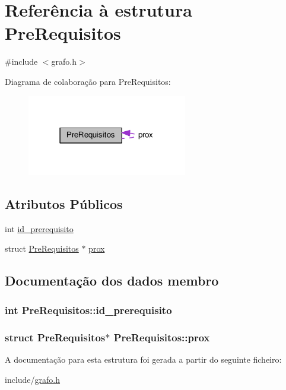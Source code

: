 \hypertarget{structPreRequisitos}{\section{Referência à estrutura Pre\-Requisitos}
\label{structPreRequisitos}
}


{\ttfamily \#include $<$grafo.\-h$>$}



Diagrama de colaboração para Pre\-Requisitos\-:
\nopagebreak
\begin{figure}[H]
\begin{center}
\leavevmode
\includegraphics[width=198pt]{structPreRequisitos__coll__graph}
\end{center}
\end{figure}
\subsection*{Atributos Públicos}
\begin{DoxyCompactItemize}
\item 
int \hyperlink{structPreRequisitos_aac895640418edfa91ba7c8f01b91459e}{id\-\_\-prerequisito}
\item 
struct \hyperlink{structPreRequisitos}{Pre\-Requisitos} $\ast$ \hyperlink{structPreRequisitos_ad30378886dd7fba5247ad1c77fb395f1}{prox}
\end{DoxyCompactItemize}


\subsection{Documentação dos dados membro}
\hypertarget{structPreRequisitos_aac895640418edfa91ba7c8f01b91459e}{
\subsubsection[{id\-\_\-prerequisito}]{\setlength{\rightskip}{0pt plus 5cm}int Pre\-Requisitos\-::id\-\_\-prerequisito}}\label{structPreRequisitos_aac895640418edfa91ba7c8f01b91459e}
\hypertarget{structPreRequisitos_ad30378886dd7fba5247ad1c77fb395f1}{
\subsubsection[{prox}]{\setlength{\rightskip}{0pt plus 5cm}struct {\bf Pre\-Requisitos}$\ast$ Pre\-Requisitos\-::prox}}\label{structPreRequisitos_ad30378886dd7fba5247ad1c77fb395f1}


A documentação para esta estrutura foi gerada a partir do seguinte ficheiro\-:\begin{DoxyCompactItemize}
\item 
include/\hyperlink{grafo_8h}{grafo.\-h}\end{DoxyCompactItemize}

